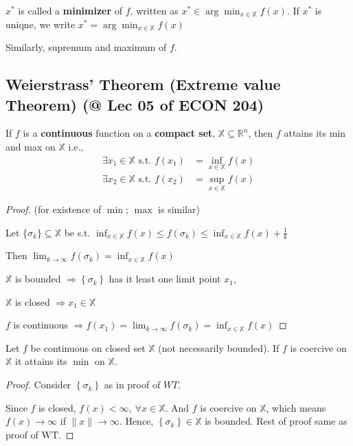 \documentclass[11pt]{elegantbook}
\begin{document}
$x^{*}$ is called a \textbf{minimizer} of $f$, written as $x^{*} \in \arg \min _{x \in \mathbb{X}} f(x)$. If $x^*$ is uniqne, we write $x^{*}=\arg \min _{x \in \mathbb{X}} f(x)
$

Similarly, supremum and maximum of $f$.

\subsection{Weierstrass' Theorem (Extreme value Theorem) \small{(@ Lec 05 of ECON 204)}}
\begin{theorem}
    \quad

    If $f$ is a \textbf{continuous} function on a \textbf{compact set}, $\mathbb{X} \subseteq \mathbb{R}^{n}$, then $f$ attains its min and max on $\mathbb{X}$ i.e.,
    $$
    \begin{aligned}
    \exists x_1 \in \mathbb{X} \text { s.t. } f\left(x_{1}\right) &=\inf _{x \in \mathbb{X}} f(x) \\
    \exists x_{2} \in \mathbb{X} \text { s.t. } f\left(x_{2}\right) &=\sup _{x \in \mathbb{X}} f(x)
    \end{aligned}
    $$
\end{theorem}
\begin{proof}
    (for existence of $\min$; $\max$ is similar)

    Let $\{\sigma_k\}\subseteq \mathbb{X}$ be s.t.
    $\inf_{x\in\mathbb{X}} f(x) \leq f\left(\sigma_{k}\right) \leq \inf _{x \in \mathbb{X}} f(x)+\frac{1}{k}$

    Then $\lim _{k \rightarrow \infty} f\left(\sigma_{k}\right)=\inf_{x\in\mathbb{X}} f(x)$

    $\mathbb{X}$ is bounded $\Rightarrow\left\{\sigma_{k}\right\}$ has it least one limit point $x_1$,

    $\mathbb{X}$ is closed $\Rightarrow x_{1} \in \mathbb{X}$

    $f$ is continuous $\Rightarrow f\left(x_{1}\right)=\lim _{k \rightarrow \infty} f\left(\sigma_{k}\right)=\inf _{x \in \mathbb{X}} f(x)$
\end{proof}

\begin{corollary}[Corollary to WT]
    Let $f$ be continuous on closed set $\mathbb{X}$ (not necessarily bounded). If $f$ is coercive on $\mathbb{X}$ it attains its $\min$ on $\mathbb{X}$.
\end{corollary}
\begin{proof}
    Consider $\left\{\sigma_{k}\right\}$ as in proof of $WT$.

    Since $f$ is closed, $f(x)<\infty,\ \forall x\in\mathbb{X}$. And $f$ is coercive on $\mathbb{X}$, which means $f(x)\rightarrow \infty$ if $\|x\| \rightarrow\infty$. Hence, $\left\{\sigma_{k}\right\}\in\mathbb{X}$ is bounded. Rest of proof same as proof of $\mathrm{WT}$.
\end{proof}
\end{document}
